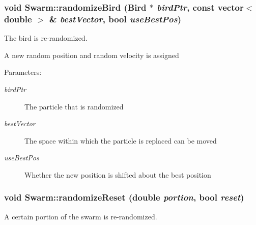 \hypertarget{classSwarm_7e8309edaf059226c469e7d6a05caddd}{
\subsubsection{\setlength{\rightskip}{0pt plus 5cm}void Swarm::randomizeBird ({\bf Bird} $\ast$ {\em birdPtr}, \/  const vector$<$ double $>$ \& {\em bestVector}, \/  bool {\em useBestPos})}}
\label{classSwarm_7e8309edaf059226c469e7d6a05caddd}


The bird is re-randomized. 

A new random position and random velocity is assigned \begin{Desc}
\item[Parameters:]
\begin{description}
\item[{\em birdPtr}]The particle that is randomized \item[{\em bestVector}]The space within which the particle is replaced can be moved \item[{\em useBestPos}]Whether the new position is shifted about the best position \end{description}
\end{Desc}
\hypertarget{classSwarm_93f011b4e32128da1ff11431ce98a577}{
\subsubsection{\setlength{\rightskip}{0pt plus 5cm}void Swarm::randomizeReset (double {\em portion}, \/  bool {\em reset})}}
\label{classSwarm_93f011b4e32128da1ff11431ce98a577}


A certain portion of the swarm is re-randomized. 

